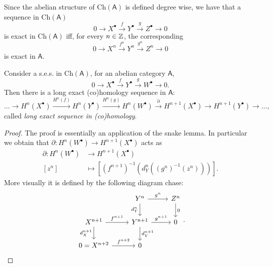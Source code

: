 \begin{rem}
	Since the abelian structure of $\mathrm{Ch}(\mathsf{A})$ is defined degree wise, we have
	that a sequence in $\mathrm{Ch}(\mathsf{A})$
	\begin{equation}
	0 \to X^\bullet \xrightarrow{f} Y^\bullet \xrightarrow{g} 
	Z^\bullet \to 0
	\end{equation} 
	is exact in $\mathrm{Ch}(\mathsf{A})$ iff, for every $n \in \mathbb{Z}$, the corresponding
	\begin{equation}
	0 \to X^n \xrightarrow{f^n} Y^n \xrightarrow{g^n}
	Z^n \to 0
	\end{equation} 
	is exact in $\mathsf{A}$.
\end{rem}

\begin{thm}
	Consider a s.e.s. in $\mathrm{Ch}(\mathsf{A})$, for an abelian category $\mathsf{A}$,
	\begin{equation}
	0 \to X^\bullet \xrightarrow{f} Y^\bullet \xrightarrow{g} W^\bullet \to 0
	.\end{equation} 
	Then there is a long exact (co)homology sequence in $\mathsf{A}$:
	\begin{equation}
		\ldots \to H^n(X^\bullet) \xrightarrow{H^n(f)} H^n(Y^\bullet) \xrightarrow{H^n(g)} 
		H^n (W^\bullet) \xrightarrow{\partial} H^{n+1}(X^\bullet) \to
		H^{n+1}(Y^\bullet) \to \ldots
	,\end{equation} 
	called \textit{long exact sequence in (co)homology}.
\end{thm}
\begin{proof}
	The proof is essentially an application of the snake lemma.
	In particular we obtain that $\partial: H^n(W^\bullet) \to H^{n+1}(X^\bullet)$ acts as
	\begin{align}
		\partial: H^n(W^\bullet) &\to H^{n+1}(X^\bullet) \\
		[z^n] &\mapsto \left[ (f^{n+1})^{-1} \left( d_Y^n ((g^n)^{-1}(z^n)) \right) \right]
	.\end{align} 
	More visually it is defined by the following diagram chase:
	\begin{equation}
	\begin{tikzcd}
		&
		Y^n \arrow[r, "g^n", rightarrow] \arrow[d, "d_Y^n"', rightarrow] &
		Z^n \arrow[d, "0", rightarrow] \\
		X^{n+1} \arrow[r, "f^{n+1}", rightarrow] \arrow[d, "d_X^{n+1}"', rightarrow] &
		Y^{n+1} \arrow[r, "g^{n+1}", rightarrow] \arrow[d, "d_Y^{n+1}", rightarrow] &
		0 \\
		0 = X^{n+2} \arrow[r, "f^{n+2}", rightarrow] &
		0
	\end{tikzcd}
	.\end{equation} 
\end{proof}

